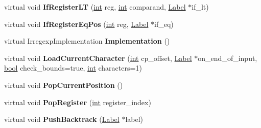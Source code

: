 \begin{DoxyCompactItemize}
virtual void {\bfseries If\+Register\+LT} (\mbox{\hyperlink{classint}{int}} reg, \mbox{\hyperlink{classint}{int}} comparand, \mbox{\hyperlink{classv8_1_1internal_1_1Label}{Label}} $\ast$if\+\_\+lt)
\item 
\mbox{\label{classv8_1_1internal_1_1RegExpMacroAssemblerMIPS_aac49a601b2823be3b741ab6179abe937}} 
virtual void {\bfseries If\+Register\+Eq\+Pos} (\mbox{\hyperlink{classint}{int}} reg, \mbox{\hyperlink{classv8_1_1internal_1_1Label}{Label}} $\ast$if\+\_\+eq)
\item 
\mbox{\label{classv8_1_1internal_1_1RegExpMacroAssemblerMIPS_a4429da28dc2889958fcdbe7a16c6aad1}} 
virtual Irregexp\+Implementation {\bfseries Implementation} ()
\item 
\mbox{\label{classv8_1_1internal_1_1RegExpMacroAssemblerMIPS_a2d190fef5eed04167abaa06f39260b7b}} 
virtual void {\bfseries Load\+Current\+Character} (\mbox{\hyperlink{classint}{int}} cp\+\_\+offset, \mbox{\hyperlink{classv8_1_1internal_1_1Label}{Label}} $\ast$on\+\_\+end\+\_\+of\+\_\+input, \mbox{\hyperlink{classbool}{bool}} check\+\_\+bounds=true, \mbox{\hyperlink{classint}{int}} characters=1)
\item 
\mbox{\label{classv8_1_1internal_1_1RegExpMacroAssemblerMIPS_af32978ed86c8ffcd05211361d28258cf}} 
virtual void {\bfseries Pop\+Current\+Position} ()
\item 
\mbox{\label{classv8_1_1internal_1_1RegExpMacroAssemblerMIPS_aa1f3f5de6dd96aae2d1005fca9536221}} 
virtual void {\bfseries Pop\+Register} (\mbox{\hyperlink{classint}{int}} register\+\_\+index)
\item 
\mbox{\label{classv8_1_1internal_1_1RegExpMacroAssemblerMIPS_abe748d8834dd7a487ed3e84a30f97d7d}} 
virtual void {\bfseries Push\+Backtrack} (\mbox{\hyperlink{classv8_1_1internal_1_1Label}{Label}} $\ast$label)
\item 
\mbox{\label{classv8_1_1internal_1_1RegExpMacroAssemblerMIPS_a1d439ae74fdb89088f9b96d2d88f1559}} 

\end{DoxyCompactItemize}
